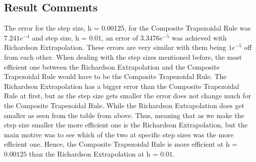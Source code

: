 \documentclass[12pt]{article}
\begin{document}
\subsection{Result Comments}
The error for the step size, h = 0.00125, for the Composite Trapezoidal Rule was $7.241e^{-4}$ and step size, h = 0.01, an error of $3.3476e^{-5}$ was achieved with Richardson Extrapolation. These errors are very similar with them being $1e^{-5}$ off from each other. When dealing with the step sizes mentioned before, the most efficient one between the Richardson Extrapolation and the Composite Trapezoidal Rule would have to be the Composite Trapezoidal Rule. The Richardson Extrapolation has a bigger error than the Composite Trapezoidal Rule at first, but as the step size gets smaller the error does not change much for the Composite Trapezoidal Rule. While the Richardson Extrapolation does get smaller as seen from the table from above. Thus, meaning that as we make the step size smaller the more efficient one is the Richardson Extrapolation, but the main motive was to see which of the two at specific step sizes was the more efficient one. Hence, the Composite Trapezoidal Rule is more efficient at h = $0.00125$ than the Richardson Extrapolation at h = $0.01$.
\end{document}
